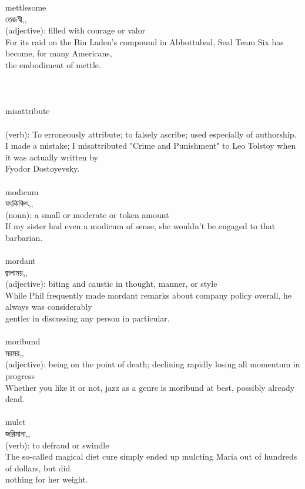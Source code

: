 \documentclass{article}
\begin{document}
{{mettlesome}\\
{তেজস্বী,,}\\
{(adjective): filled with courage or valor\\For its raid on the Bin Laden's compound in Abbottabad, Seal Team Six has become, for many Americans,\\the embodiment of mettle.\\\\                                                                               \\}\\
{misattribute}\\
{}\\
{(verb): To erroneously attribute; to falsely ascribe; used especially of authorship.\\I made a mistake; I misattributed "Crime and Punishment" to Leo Tolstoy when it was actually written by\\Fyodor Dostoyevsky.\\}\\
{modicum}\\
{যৎকিঞ্চিৎ,,}\\
{(noun): a small or moderate or token amount\\If my sister had even a modicum of sense, she wouldn't be engaged to that barbarian.\\}\\
{mordant}\\
{জ্বালাময়,,}\\
{(adjective): biting and caustic in thought, manner, or style\\While Phil frequently made mordant remarks about company policy overall, he always was considerably\\gentler in discussing any person in particular.\\}\\
{moribund}\\
{মরমর,,}\\
{(adjective): being on the point of death; declining rapidly losing all momentum in progress\\Whether you like it or not, jazz as a genre is moribund at best, possibly already dead.\\}\\
{mulct}\\
{জরিমানা,,}\\
{(verb): to defraud or swindle\\The so-called magical diet cure simply ended up mulcting Maria out of hundreds of dollars, but did\\nothing for her weight.\\}\\
}
\end{document}
